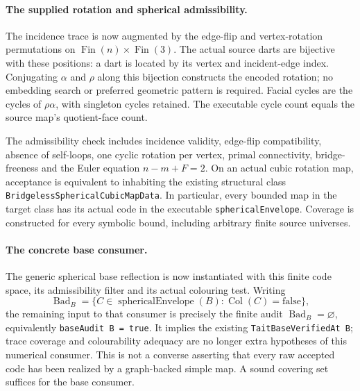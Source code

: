 \paragraph{The supplied rotation and spherical admissibility.}
The incidence trace is now augmented by the edge-flip and vertex-rotation
permutations on $\operatorname{Fin}(n)\times\operatorname{Fin}(3)$.
The actual source darts are bijective with these positions: a dart is
located by its vertex and incident-edge index. Conjugating $\alpha$ and
$\rho$ along this bijection constructs the encoded rotation; no embedding
search or preferred geometric pattern is required. Facial cycles are
the cycles of $\rho\alpha$, with singleton cycles retained. The executable
cycle count equals the source map's quotient-face count.

The admissibility check includes incidence validity, edge-flip compatibility,
absence of self-loops, one cyclic rotation per vertex, primal connectivity,
bridge-freeness and the Euler equation $n-m+F=2$. On an actual cubic
rotation map, acceptance is equivalent to inhabiting the existing structural
class \texttt{BridgelessSphericalCubicMapData}.
In particular, every bounded map in the target class has its actual code in
the executable \texttt{sphericalEnvelope}. Coverage is constructed for every
symbolic bound, including arbitrary finite source universes.

\paragraph{The concrete base consumer.}
The generic spherical base reflection is now instantiated with this finite
code space, its admissibility filter and its actual colouring test.
Writing
\[
 \operatorname{Bad}_B
   =\{C\in\operatorname{sphericalEnvelope}(B):
                    \operatorname{Col}(C)=\mathrm{false}\},
\]
the remaining input to that consumer is precisely the finite audit
$\operatorname{Bad}_B=\varnothing$, equivalently
\texttt{baseAudit B = true}. It implies the existing
\texttt{TaitBaseVerifiedAt B}; trace coverage and colourability adequacy are
no longer extra hypotheses of this numerical consumer.
This is not a converse asserting that every raw accepted code has been
realized by a graph-backed simple map. A sound covering set suffices for
the base consumer.

